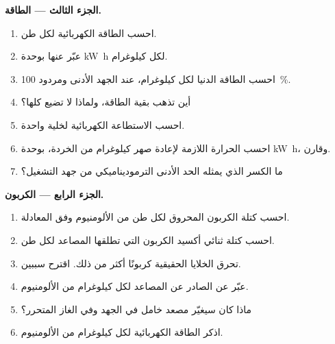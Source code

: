 \begin{problem}
\medskip
\noindent\textbf{الجزء الثالث --- الطاقة.}
\begin{enumerate}[resume]
  \item احسب الطاقة الكهربائية لكل طن.
  \item عبّر عنها بوحدة \unit{kW.h} لكل كيلوغرام.
  \item احسب الطاقة الدنيا لكل كيلوغرام، عند الجهد الأدنى ومردود
        100~\%.
  \item أين تذهب بقية الطاقة، ولماذا لا تضيع
        كلها؟
  \item احسب الاستطاعة الكهربائية لخلية واحدة.
  \item احسب الحرارة اللازمة لإعادة صهر كيلوغرام من الخردة، بوحدة
        \unit{kW.h}، وقارن.
  \item ما الكسر الذي يمثله الحد الأدنى الترموديناميكي من جهد التشغيل؟
\end{enumerate}

\medskip
\noindent\textbf{الجزء الرابع --- الكربون.}
\begin{enumerate}[resume]
  \item احسب كتلة الكربون المحروق لكل طن من الألومنيوم وفق
        المعادلة.
  \item احسب كتلة ثنائي أكسيد الكربون التي تطلقها المصاعد لكل طن.
  \item تحرق الخلايا الحقيقية كربونًا أكثر من ذلك. اقترح سببين.
  \item عبّر عن  الصادر عن المصاعد لكل كيلوغرام من الألومنيوم.
  \item ماذا كان سيغيّر مصعد خامل في الجهد وفي الغاز
        المتحرر؟
  \item اذكر الطاقة الكهربائية لكل كيلوغرام من الألومنيوم.
\end{enumerate}
\end{problem}
